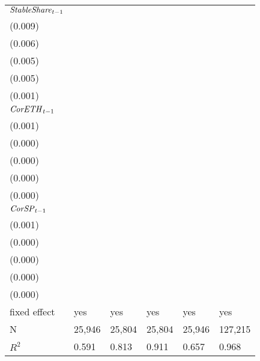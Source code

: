 \begin{tabular}{llllll}
${{\it StableShare}}_{t-1}$  &   \makecell{$0.171^{***}$ \\ (0.009)} &     \makecell{$-0.007^{}$ \\ (0.006)} &    \makecell{$-0.002^{}$ \\ (0.005)} &  \makecell{$0.117^{***}$ \\ (0.005)} &   \makecell{$0.011^{***}$ \\ (0.001)} \\
${{\it CorETH}}_{t-1}$       &   \makecell{$0.003^{***}$ \\ (0.001)} &    \makecell{$0.001^{**}$ \\ (0.000)} &     \makecell{$0.001^{}$ \\ (0.000)} &    \makecell{$-0.000^{}$ \\ (0.000)} &     \makecell{$-0.000^{}$ \\ (0.000)} \\
${{\it CorSP}}_{t-1}$        &  \makecell{$-0.002^{***}$ \\ (0.001)} &     \makecell{$-0.000^{}$ \\ (0.000)} &    \makecell{$-0.000^{}$ \\ (0.000)} &     \makecell{$0.000^{}$ \\ (0.000)} &      \makecell{$0.000^{}$ \\ (0.000)} \\
\midrule fixed effect        &                                   yes &                                   yes &                                  yes &                                  yes &                                   yes \\
N                            &                                25,946 &                                25,804 &                               25,804 &                               25,946 &                               127,215 \\
$R^2$                        &                                 0.591 &                                 0.813 &                                0.911 &                                0.657 &                                 0.968 \\
\bottomrule
\end{tabular}
